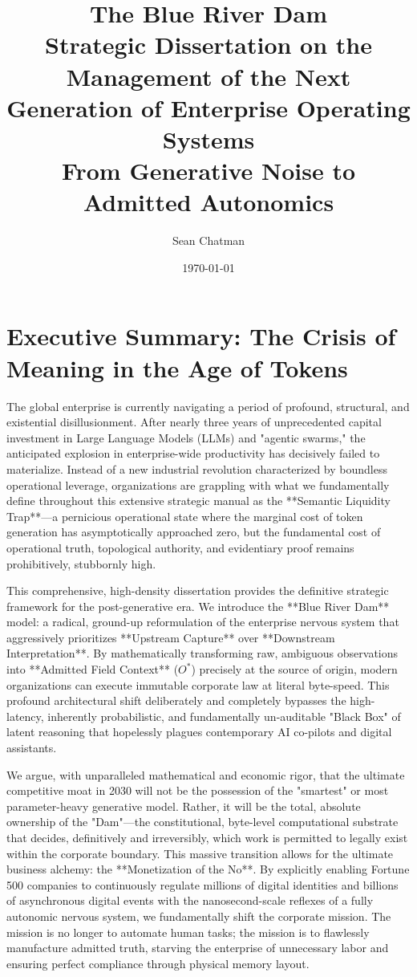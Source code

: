 \documentclass[12pt,a4paper,oneside]{book}
\title{\textbf{\huge \color{hbrblue}The Blue River Dam}\\\vspace{1em}\Large \color{hbrred}Strategic Dissertation on the Management of the Next Generation of Enterprise Operating Systems\\\vspace{0.5em}From Generative Noise to Admitted Autonomics}
\author{Sean Chatman}
\date{\today}
\begin{document}
\maketitle

\chapter*{Executive Summary: The Crisis of Meaning in the Age of Tokens}
The global enterprise is currently navigating a period of profound, structural, and existential disillusionment. After nearly three years of unprecedented capital investment in Large Language Models (LLMs) and "agentic swarms," the anticipated explosion in enterprise-wide productivity has decisively failed to materialize. Instead of a new industrial revolution characterized by boundless operational leverage, organizations are grappling with what we fundamentally define throughout this extensive strategic manual as the **Semantic Liquidity Trap**---a pernicious operational state where the marginal cost of token generation has asymptotically approached zero, but the fundamental cost of operational truth, topological authority, and evidentiary proof remains prohibitively, stubbornly high. 

This comprehensive, high-density dissertation provides the definitive strategic framework for the post-generative era. We introduce the **Blue River Dam** model: a radical, ground-up reformulation of the enterprise nervous system that aggressively prioritizes **Upstream Capture** over **Downstream Interpretation**. By mathematically transforming raw, ambiguous observations into **Admitted Field Context** ($O^*$) precisely at the source of origin, modern organizations can execute immutable corporate law at literal byte-speed. This profound architectural shift deliberately and completely bypasses the high-latency, inherently probabilistic, and fundamentally un-auditable "Black Box" of latent reasoning that hopelessly plagues contemporary AI co-pilots and digital assistants. 

We argue, with unparalleled mathematical and economic rigor, that the ultimate competitive moat in 2030 will not be the possession of the "smartest" or most parameter-heavy generative model. Rather, it will be the total, absolute ownership of the "Dam"---the constitutional, byte-level computational substrate that decides, definitively and irreversibly, which work is permitted to legally exist within the corporate boundary. This massive transition allows for the ultimate business alchemy: the **Monetization of the No**. By explicitly enabling Fortune 500 companies to continuously regulate millions of digital identities and billions of asynchronous digital events with the nanosecond-scale reflexes of a fully autonomic nervous system, we fundamentally shift the corporate mission. The mission is no longer to automate human tasks; the mission is to flawlessly manufacture admitted truth, starving the enterprise of unnecessary labor and ensuring perfect compliance through physical memory layout.
\end{document}
